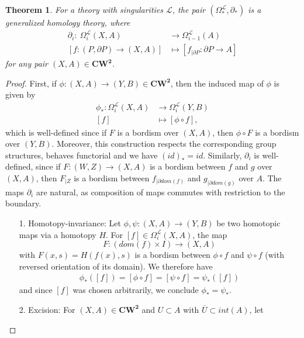 \documentclass{scrreprt}
\newtheorem{theorem}[prop]{Theorem}
\begin{document}
\begin{theorem}\label{Omegageneralizedhomology}
For a theory with singularities $\mathcal{L}$, the pair $(\Omega_*^{\mathcal{L}}, \partial_*)$ is a generalized homology theory, where 
\begin{align*}
\partial_i :\  \Omega_i^{\mathcal{L}}(X,A) &\to \Omega_{i-1}^{\mathcal{L}}(A) \\
[f: (P, \partial P) \to (X,A)] &\mapsto [f_{| \partial P}: \partial P \to A]
\end{align*}
for any pair $(X,A) \in \boldsymbol{CW^2}$.
\end{theorem}

\begin{proof}
First, if $\phi : (X,A) \to (Y,B) \in \boldsymbol{CW^2}$, then the induced map of $\phi $ is given by
\begin{align*}
\phi_* : \Omega_i^{\mathcal{L}}(X,A) &\to \Omega_i^{\mathcal{L}}(Y,B) \\
[f] &\mapsto [\phi \circ f],
\end{align*}
which is well-defined since if $F$ is a bordism over $(X,A)$, then $\phi \circ F$ is a bordism over $(Y,B)$. Moreover, this construction respects the corresponding group structures, behaves functorial and we have $(id)_*=id$. Similarly, $\partial_i$ is well-defined, since if $F:(W,Z) \to (X,A)$ is a bordism between $f$ and $g$ over $(X,A)$, then $F_{|Z}$ is a bordism between $f_{| \partial dom(f)}$ and $g_{| \partial dom(g)}$ over $A$. The maps $\partial_i$ are natural, as composition of maps commutes with restriction to the boundary. 
\begin{itemize}
\item[1.] Homotopy-invariance: Let $\phi, \psi : (X,A) \to (Y,B)$ be two homotopic maps via a homotopy $H$. For $[f] \in \Omega_i^{\mathcal{L}}(X,A)$, the map
\begin{equation*}
F: (dom(f) \times I) \to (X,A) 
\end{equation*}
with $F(x,s)=H(f(x),s)$ is a bordism between $\phi \circ f$ and $\psi \circ f$ (with reversed orientation of its domain). We therefore have
\begin{align*}
\phi_* ([f]) = [\phi \circ f] = [\psi \circ f] = \psi_* ([f])
\end{align*}
and since $[f]$ was chosen arbitrarily, we conclude $\phi_*= \psi_*$.
\item[2.] Excision: For $(X,A) \in \boldsymbol{CW^2}$ and $U \subset A$ with $\overline{U} \subset int(A)$, let 
\begin{equation*}

\end{equation*}
\end{itemize}
\end{proof}
\end{document}

